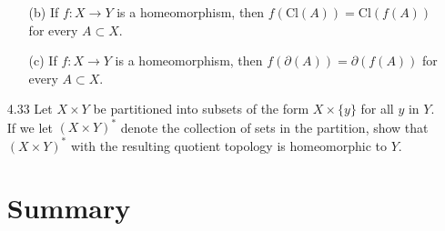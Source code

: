 \documentclass[12pt]{article}
\begin{document}
\begin{enumerate}
\begin{enumerate}
		\item[(b)] If $f : X \rightarrow Y$ is a homeomorphism, then $f ( \mathrm { Cl } ( A ) ) = \mathrm { Cl } ( f ( A ) )$ for every $A \subset X .$
		
		\item[(c)] If $f : X \rightarrow Y$ is a homeomorphism, then $f ( \partial ( A ) ) = \partial ( f ( A ) )$ for every	$A \subset X .$
	\end{enumerate}
	
	\item[4.33] Let $X \times Y$ be partitioned into subsets of the form $X \times \{ y \}$ for all $y$ in $Y .$ If we let $( X \times Y ) ^ { * }$ denote the collection of sets in the partition, show that $( X \times Y ) ^ { * }$ with the resulting quotient topology is homeomorphic to $Y .$

	\section*{Summary}
	
\end{enumerate}
 
\end{document}
